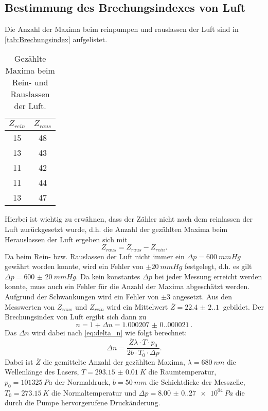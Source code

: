 \subsection{Bestimmung des Brechungsindexes von Luft}
Die Anzahl der Maxima beim reinpumpen und rauslassen der Luft sind in \autoref{tab:Brechungsindex} aufgelistet.
\begin{table}[H]
  \centering
  \caption{Gezählte Maxima beim Rein- und Rauslassen der Luft.}
  \begin{tabular}{c c}
      \toprule
      $Z_{rein}$ & $Z_{raus}$\\
      \midrule
      15 & 48\\
      13 & 43\\
      11 & 42\\
      11 & 44\\
      13 & 47\\
      \bottomrule
  \end{tabular}
  \label{tab:Brechungsindex}
\end{table}
Hierbei ist wichtig zu erwähnen, dass der Zähler nicht nach dem reinlassen der Luft zurückgesetzt wurde, d.h. die Anzahl der gezählten Maxima beim Herauslassen der Luft
ergeben sich mit
\begin{equation*}
  Z_{raus} = Z_{raus} - Z_{rein}.
\end{equation*}
Da beim Rein- bzw. Rauslassen der Luft nicht immer ein $\Delta p = \SI{600}{mmHg}$ gewährt worden konnte, wird ein Fehler von $\pm \SI{20}{mmHg}$ festgelegt, d.h. es gilt 
$\Delta p = \SI{600(20)}{mmHg}$.
Da kein konstantes $\Delta p$ bei jeder Messung erreicht werden konnte, muss auch ein Fehler für die Anzahl der Maxima abgeschätzt werden. Aufgrund der Schwankungen
wird ein Fehler von $\pm 3$ angesetzt.
Aus den Messwerten von $Z_{raus}$ und $Z_{rein}$ wird ein Mittelwert $\overline{Z} = \SI{22.4(2.1)}{}$ gebildet. Der Brechungsindex von Luft ergibt sich dann zu
\begin{equation*}
  n = 1 + \Delta n = \SI{1.000207(0.000021)}{}.
\end{equation*}
Das $\Delta n$ wird dabei nach \autoref{eq:delta_n} wie folgt berechnet:
\begin{equation*}
  \Delta n = \frac{\overline{Z}\lambda \cdot T \cdot p_0}{2b \cdot T_0 \cdot \Delta p}.
\end{equation*}
Dabei ist $\overline{Z}$ die gemittelte Anzahl der gezählten Maxima, $\lambda = \SI{680}{nm}$ die Wellenlänge des Lasers, $T = \SI{293.15(1)}{K}$ die Raumtemperatur,
$p_0 = \SI{101325}{Pa}$ \cite{p_normal} der Normaldruck, $b = \SI{50}{mm}$ die Schichtdicke der Messzelle, $T_0 = \SI{273.15}{K}$ die Normaltemperatur und $\Delta p = \SI{8.00(0.27)e+04}{Pa}$
die durch die Pumpe hervorgerufene Druckänderung.
